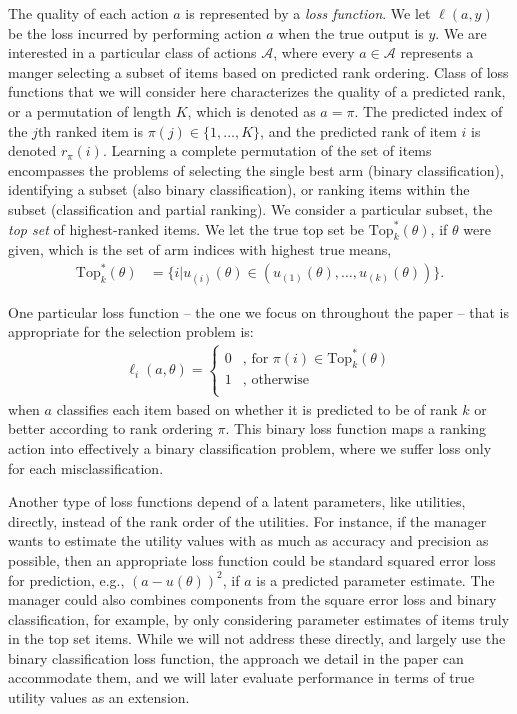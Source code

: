 \documentclass[nonblindrev]{informs3}
\newcommand{\numitems}{K}
\newcommand{\topset}{\text{Top}_k}
\begin{document}
The quality of each action $a$ is represented by a \emph{loss function}. We let $\ell(a,y)$ be the loss incurred by performing action $a$ when the true output is $y$. We are interested in a particular class of actions $\mathcal{A}$, where every $a \in \mathcal{A}$ represents a manger selecting a subset of items based on predicted rank ordering. Class of loss functions that we will consider here characterizes the quality of a predicted rank, or a permutation of length $\numitems$, which is denoted as $a=\pi$. The predicted index of the $j$th ranked item is $\pi(j) \in \{1,\ldots,\numitems\}$, and the predicted rank of item $i$ is denoted $r_\pi(i)$. Learning a complete permutation of the set of items encompasses the problems of selecting the single best arm (binary classification), identifying a subset (also binary classification), or ranking items within the subset (classification and partial ranking). We consider a particular subset, the \emph{top set} of highest-ranked items. We let the true top set be $\topset^{*}(\theta)$, if $\theta$ were given, which is the set of arm indices with highest true means, 
\begin{align}
\topset^{*}(\theta) &= \{i | u_{(i)}(\theta) \in ( u_{(1)}(\theta),\ldots,u_{(k)}(\theta) ) \}.
\end{align}

One particular loss function -- the one we focus on throughout the paper -- that is appropriate for the selection problem is:
\begin{align}
\ell_i(a,\theta) = 
	\begin{cases} 
	0 &\text{, for } \pi(i) \in \topset^{*}(\theta) \\
	1 &\text{, otherwise} \\
	\end{cases}
\end{align}
when $a$ classifies each item based on whether it is predicted to be of rank $k$ or better according to rank ordering $\pi$. This binary loss function maps a ranking action into effectively a binary classification problem, where we suffer loss only for each misclassification.

Another type of loss functions depend of a latent parameters, like utilities, directly, instead of the rank order of the utilities. For instance, if the manager wants to estimate the utility values with as much as accuracy and precision as possible, then an appropriate loss function could be standard squared error loss for prediction, e.g., $(a-u(\theta))^2$, if $a$ is a predicted parameter estimate. The manager could also combines components from the square error loss and binary classification, for example, by only considering parameter estimates of items truly in the top set items. While we will not address these directly, and largely use the binary classification loss function, the approach we detail in the paper can accommodate them, and we will later evaluate performance in terms of true utility values as an extension.
\end{document}
